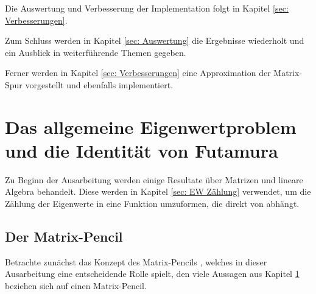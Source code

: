 \documentclass[a4paper,12pt]{report}
\newcommand{\zitat}[1]{\glqq #1\grqq}
\newcommand{\1}{\mathds{1}}
\theoremstyle{plain} %
\theoremstyle{definition} %
\theoremstyle{remark}
\begin{document}

      Die Auswertung und Verbesserung der Implementation folgt in Kapitel \ref{sec: Verbesserungen}.



      Zum Schluss werden in Kapitel \ref{sec: Auswertung} die Ergebnisse wiederholt und ein Ausblick in weiterführende Themen gegeben.

      Ferner werden in Kapitel \ref{sec: Verbesserungen} eine Approximation der Matrix-Spur vorgestellt und ebenfalls implementiert.

\chapter{Das allgemeine Eigenwertproblem und die Identität von Futamura}
\label{sec: EW Problem_Futamura}

      Zu Beginn der Ausarbeitung werden einige Resultate über Matrizen und lineare Algebra behandelt.
      Diese werden in Kapitel \ref{sec: EW Zählung} verwendet, um die Zählung der Eigenwerte in eine Funktion \J umzuformen, die direkt von \s abhängt.
      
      \section{Der Matrix-Pencil}
            Betrachte zunächst das Konzept des \zitat{Matrix-Pencils} \cite[S. 32]{matrixPencilDeutsch}, welches in dieser Ausarbeitung eine entscheidende Rolle spielt,
            den viele Aussagen aus Kapitel \ref{sec: EW Problem_Futamura} beziehen sich auf einen Matrix-Pencil.
      
\end{document}
